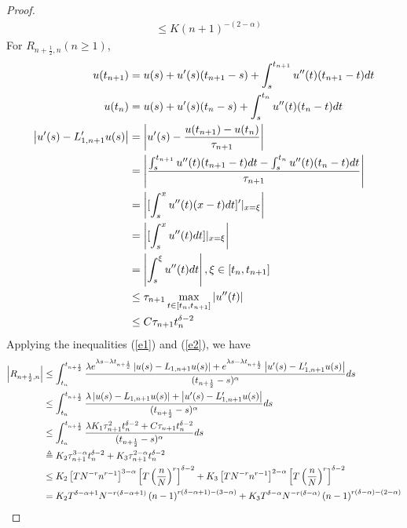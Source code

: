 \documentclass[10pt, reqno]{amsart}
\theoremstyle{remark}
\theoremstyle{definition}
\numberwithin{table}{section}
\begin{document}
\begin{proof}
\begin{align*}
    &\leq K(n+1)^{-(2-\alpha)}
\end{align*}
For $R_{{n+\frac{1}{2}}, n}(n\geq 1)$, 
\begin{align}
u(t_{n+1})&=u(s)+u'(s)(t_{n+1}-s)+\int_s^{t_{n+1}}u''(t)(t_{n+1}-t)dt\notag\\
u(t_{n})&=u(s)+u'(s)(t_{n}-s)+\int_s^{t_{n}}u''(t)(t_{n}-t)dt\notag\\
    \left|u'(s)-L_{1, n+1}'u(s)\right|&=\left|u'(s)-\frac{u(t_{n+1})-u(t_n)}{\tau_{n+1}}\right|\notag\\
    &=\left|\frac{\int_s^{t_{n+1}}u''(t)(t_{n+1}-t)dt-\int_s^{t_{n}}u''(t)(t_{n}-t)dt}{\tau_{n+1}}\right|\notag\\
    &=\left|[\int_s^{x}u''(t)(x-t)dt]'|_{x=\xi}\right|\notag\\
    &=\left|[\int_s^{x}u''(t)dt]|_{x=\xi}\right|\notag\\
    &=\left|\int_s^{\xi}u''(t)dt\right|, \xi\in [t_n, t_{n+1}] \notag\\
    &\leq \tau_{n+1}\max_{t\in[t_n, t_{n+1}]}|u''(t)|\notag\\
    &\leq C\tau_{n+1}t_n^{\delta-2}\label{e2}
\end{align}
Applying the inequalities (\ref{e1}) and (\ref{e2}), we have
    \begin{align}
\left|R_{{n+\frac{1}{2}}, n}\right|&\leq \int_{t_n}^{t_{n+\frac{1}{2}}}\frac{\lambda e^{\lambda s-\lambda t_{n+\frac{1}{2}}}\left|u(s)-L_{1, n+1}u(s)\right|+e^{\lambda s-\lambda t_{n+\frac{1}{2}}}\left|u'(s)-L_{1, n+1}'u(s)\right|}{(t_{n+\frac{1}{2}}-s)^\alpha}ds\notag\\
&\leq \int_{t_n}^{t_{n+\frac{1}{2}}}\frac{\lambda \left|u(s)-L_{1, n+1}u(s)\right|+\left|u'(s)-L_{1, n+1}'u(s)\right|}{(t_{n+\frac{1}{2}}-s)^\alpha}ds\notag\\
&\leq \int_{t_n}^{t_{n+\frac{1}{2}}}\frac{\lambda K_1\tau_{n+1}^2t_{n}^{\delta-2}+C\tau_{n+1}t_n^{\delta-2}}{(t_{n+\frac{1}{2}}-s)^\alpha}ds\notag\\
&\triangleq{}K_2\tau_{n+1}^{3-\alpha}t_{n}^{\delta-2}+K_3\tau_{n+1}^{2-\alpha}t_{n}^{\delta-2}\notag\\
&\leq K_2\left[TN^{-r}n^{r-1}\right]^{3-\alpha}\left[T\left(\frac{n}N\right)^r\right]^{\delta-2}+ K_3\left[TN^{-r}n^{r-1}\right]^{2-\alpha}\left[T\left(\frac{n}N\right)^r\right]^{\delta-2} \notag\\
&= K_2 T^{\delta-\alpha+1}N^{-r(\delta-\alpha+1)}\left(n-1\right)^{r(\delta-\alpha+1)-(3-\alpha)}+K_3 T^{\delta-\alpha}N^{-r(\delta-\alpha)}\left(n-1\right)^{r(\delta-\alpha)-(2-\alpha)} \notag\\

\end{align}
\end{proof}
\end{document}
